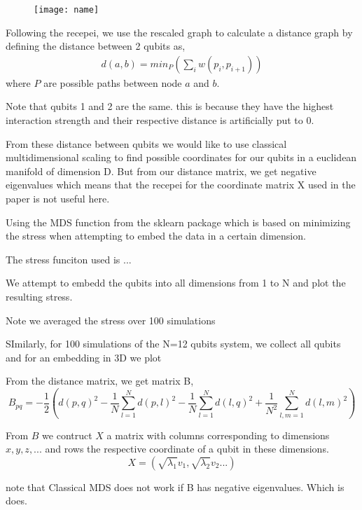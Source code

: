 \documentclass{article}
\begin{document}
\begin{figure}
    \texttt{[image: name]}
\end{figure}

Following the recepei, we use the rescaled graph to calculate a distance graph by defining the distance between 2 qubits as, 
\begin{eqnarray}
    d(a,b)=min_P(\sum_{i} w(p_i,p_{i+1}))
\end{eqnarray}
where $P$ are possible paths between node $a$ and $b$.

\begin{figure}
    
\end{figure}
Note that qubits 1 and 2 are the same. this is because they have the highest interaction strength and their respective distance is artificially put to 0.

From these distance between qubits we would like to use classical multidimensional scaling to find possible coordinates for our qubits in a euclidean manifold of dimension D. 
But from our distance matrix, we get negative eigenvalues which means that the recepei for the coordinate matrix X used in the paper is not useful here.

Using the MDS function from the sklearn package which is based on minimizing the stress when attempting to embed the data in a certain dimension. 

The stress funciton used is ...

We attempt to embedd the qubits into all dimensions from 1 to N and plot the resulting stress.
\begin{figure}
    
\end{figure}
Note we averaged the stress over 100 simulations

SImilarly, for 100 simulations of the N=12 qubits system, we collect all qubits and for an embedding in 3D we plot 

From the distance matrix, we get matrix B,
$$B_{pq}=-\frac{1}{2}(d(p,q)^2-\frac{1}{N}\sum^{N}_{l=1}d(p,l)^2-\frac{1}{N}\sum^{N}_{l=1}d(l,q)^2+\frac{1}{N^2}\sum^N_{l,m=1}d(l,m)^2)$$

From $B$ we contruct $X$ a matrix with columns corresponding to dimensions $x,y,z,...$ and rows the respective coordinate of a qubit in these dimensions.
$$X=(\sqrt{\lambda_1}v_1,\sqrt{\lambda_2}v_2...)$$

note that Classical MDS does not work if B has negative eigenvalues. Which is does.
\end{document}
